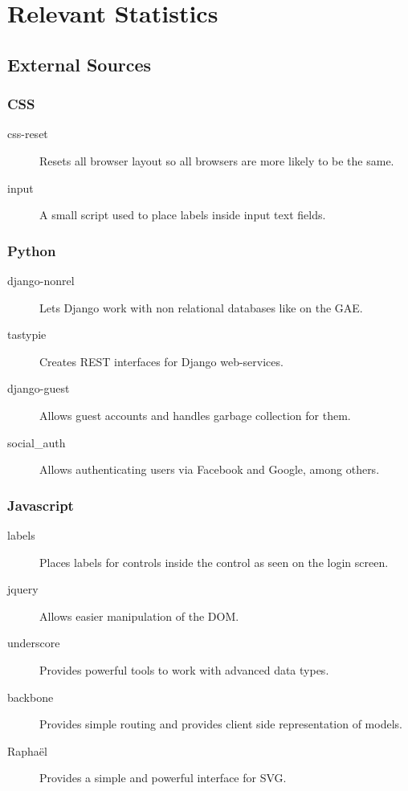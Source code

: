 \section{Relevant Statistics}
\subsection{External Sources}
\subsubsection{CSS}
\begin{description}
	\item[css-reset] Resets all browser layout so all browsers are more likely to be the same.
	\item[input] A small script used to place labels inside input text fields.
\end{description}
	
\subsubsection{Python}
\begin{description}
	\item[django-nonrel] Lets Django work with non relational databases like on the GAE.
	\item[tastypie] Creates REST interfaces for Django web-services.
	\item[django-guest] Allows guest accounts and handles garbage collection for them.
	\item[social{\_}auth] Allows authenticating users via Facebook and Google, among others.
\end{description}

\subsubsection{Javascript}
\begin{description}
	\item[labels] Places labels for controls inside the control as seen on the login screen.
	\item[jquery] Allows easier manipulation of the DOM.
	\item[underscore] Provides powerful tools to work with advanced data types.
	\item[backbone] Provides simple routing and provides client side representation of models.
	\item[Rapha\"{e}l] Provides a simple and powerful interface for SVG.
\end{description}

